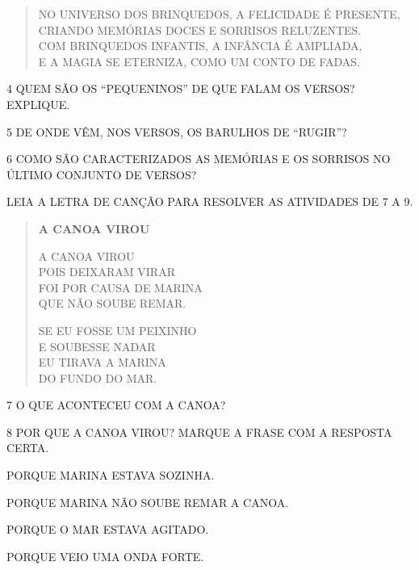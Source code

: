 \begin{myquote}
\begin{verse}
NO UNIVERSO DOS BRINQUEDOS, A FELICIDADE É PRESENTE,\\
CRIANDO MEMÓRIAS DOCES E SORRISOS RELUZENTES.\\
COM BRINQUEDOS INFANTIS, A INFÂNCIA É AMPLIADA,\\
E A MAGIA SE ETERNIZA, COMO UM CONTO DE FADAS.
\end{verse}

\end{myquote}

\num{4} QUEM SÃO OS ``PEQUENINOS'' DE QUE FALAM OS VERSOS? EXPLIQUE.


\num{5} DE ONDE VÊM, NOS VERSOS, OS BARULHOS DE ``RUGIR''?


\num{6} COMO SÃO CARACTERIZADOS AS MEMÓRIAS E OS SORRISOS NO ÚLTIMO CONJUNTO DE VERSOS?


LEIA A LETRA DE CANÇÃO PARA RESOLVER AS ATIVIDADES DE 7 A 9.

\begin{myquote}
\begin{verse}
\textbf{A CANOA VIROU}

A CANOA VIROU\\
POIS DEIXARAM VIRAR\\
FOI POR CAUSA DE MARINA\\
QUE NÃO SOUBE REMAR.

SE EU FOSSE UM PEIXINHO\\
E SOUBESSE NADAR\\
EU TIRAVA A MARINA\\
DO FUNDO DO MAR.
\end{verse}

\end{myquote}

\num{7} O QUE ACONTECEU COM A CANOA?



\num{8} POR QUE A CANOA VIROU? MARQUE A FRASE COM A RESPOSTA CERTA.

\begin{boxlist}[itemsep=0pt]
 PORQUE MARINA ESTAVA SOZINHA.

 PORQUE MARINA NÃO SOUBE REMAR A CANOA.

 PORQUE O MAR ESTAVA AGITADO.

 PORQUE VEIO UMA ONDA FORTE.
\end{boxlist}

